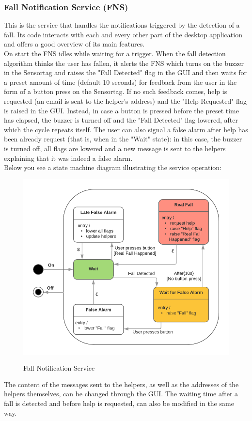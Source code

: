 \documentclass[hidelinks,conference,12pt]{IEEETran}
\begin{document}
\subsubsection{Fall Notification Service (FNS)}
This is the service that handles the notifications triggered by the detection of a fall. Its code interacts with each and every other part of the desktop application and offers a good overview of its main features.\\
On start the FNS idles while waiting for a trigger. When the fall detection algorithm thinks the user has fallen, it alerts the FNS which turns on the buzzer in the Sensortag and raises the "Fall Detected" flag in the GUI and then waits for a preset amount of time (default 10 seconds) for feedback from the user in the form of a button press on the Sensortag. If no such feedback comes, help is requested (an email is sent to the helper’s address) and the "Help Requested" flag is raised in the GUI. Instead, in case a button is pressed before the preset time has elapsed, the buzzer is turned off and the "Fall Detected" flag lowered, after which the cycle repeats itself. The user can also signal a false alarm after help has been already request (that is, when in the "Wait" state): in this case, the buzzer is turned off, all flags are lowered and a new message is sent to the helpers explaining that it was indeed a false alarm.\\
Below you see a state machine diagram illustrating the service operation:
\FloatBarrier
\begin{figure}[!h]
	\centering
	\caption{Fall Notification Service}
	\includegraphics[scale=0.3]{images/FNS.png}
	\label{img:FNS}
\end{figure}
\FloatBarrier
The content of the messages sent to the helpers, as well as the addresses of the helpers themselves, can be changed through the GUI. The waiting time after a fall is detected and before help is requested, can also be modified in the same way.
\end{document}
